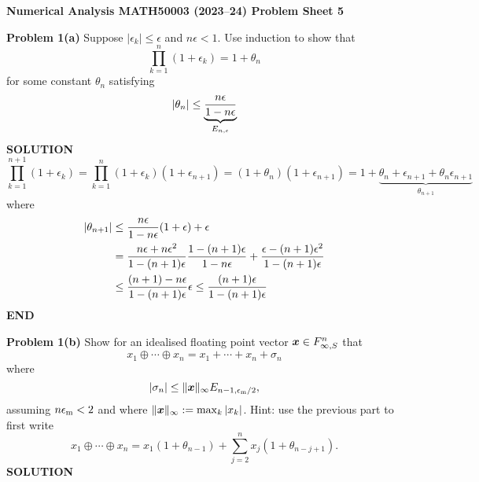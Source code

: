 \documentclass[12pt,a4paper]{article}
\def\endash{–}
\def\x{ {\vc x} }
\begin{document}
\textbf{Numerical Analysis MATH50003 (2023\ensuremath{\endash}24) Problem Sheet 5}

\textbf{Problem 1(a)}  Suppose $|\ensuremath{\epsilon}_k| \ensuremath{\leq} \ensuremath{\epsilon}$ and $n \ensuremath{\epsilon} < 1$. Use induction to show that
\[
\ensuremath{\prod}_{k=1}^n (1+\ensuremath{\epsilon}_k) = 1+\ensuremath{\theta}_n
\]
for some constant $\ensuremath{\theta}_n$ satisfying
\[
|\ensuremath{\theta}_n| \ensuremath{\leq} \underbrace{n \ensuremath{\epsilon} \over 1-n\ensuremath{\epsilon}}_{E_{n,\ensuremath{\epsilon}}}
\]
\textbf{SOLUTION}
\[
\ensuremath{\prod}_{k=1}^{n+1} (1+\ensuremath{\epsilon}_k) = \ensuremath{\prod}_{k=1}^n (1+\ensuremath{\epsilon}_k) (1+\ensuremath{\epsilon}_{n+1}) = (1+\ensuremath{\theta}_n)(1+\ensuremath{\epsilon}_{n+1}) = 1 + \underbrace{\ensuremath{\theta}_n + \ensuremath{\epsilon}_{n+1} + \ensuremath{\theta}_n\ensuremath{\epsilon}_{n+1}}_{\ensuremath{\theta}_{n+1}}
\]
where
\begin{align*}
|\ensuremath{\theta}_{n+1}| &\ensuremath{\leq} {n \ensuremath{\epsilon} \over 1-n\ensuremath{\epsilon}}(1+\ensuremath{\epsilon}) + \ensuremath{\epsilon} \\
&={n \ensuremath{\epsilon} + n \ensuremath{\epsilon}^2 \over 1-(n+1)\ensuremath{\epsilon}} {1-(n+1)\ensuremath{\epsilon} \over 1-n\ensuremath{\epsilon}}  + {\ensuremath{\epsilon}-(n+1)\ensuremath{\epsilon}^2 \over 1-(n+1)\ensuremath{\epsilon}} \\
&\ensuremath{\leq} {(n+1)  - n \ensuremath{\epsilon} \over 1-(n+1)\ensuremath{\epsilon}} \ensuremath{\epsilon} \ensuremath{\leq} {(n+1) \ensuremath{\epsilon} \over 1-(n+1)\ensuremath{\epsilon}} 
\end{align*}
\textbf{END}

\textbf{Problem 1(b)} Show for an idealised floating point vector $\ensuremath{\bm{\x}} \ensuremath{\in} F_{\ensuremath{\infty},S}^n$  that
\[
x_1 \ensuremath{\oplus} \ensuremath{\cdots} \ensuremath{\oplus} x_n = x_1 +  \ensuremath{\cdots} + x_n + \ensuremath{\sigma}_n
\]
where
\[
|\ensuremath{\sigma}_n| \ensuremath{\leq} \| \ensuremath{\bm{\x}} \|_\ensuremath{\infty} E_{n-1,\ensuremath{\epsilon}_{\rm m}/2},
\]
assuming $n \ensuremath{\epsilon}_{\rm m} < 2$ and where $\|\ensuremath{\bm{\x}}\|_\ensuremath{\infty} := \max_k |x_k|$. Hint: use the previous part to first write
\[
x_1 \ensuremath{\oplus} \ensuremath{\cdots} \ensuremath{\oplus} x_n = x_1(1+\ensuremath{\theta}_{n-1}) + \ensuremath{\sum}_{j=2}^n x_j (1 + \ensuremath{\theta}_{n-j+1}).
\]
\textbf{SOLUTION}
\end{document}
